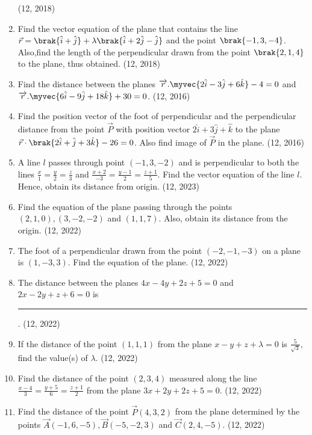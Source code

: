 \begin{enumerate}[label=\thesubsection.\arabic*, ref=\thesubsection.\theenumi]
\hfill (12, 2018)
\item Find the vector equation of the plane that contains the line $\vec{r}=\brak{\hat{i}+\hat{j}}+\lambda \brak{\hat{i}+2\hat{j} - \hat{j}}$ and the point $\brak{-1,3,-4}$. Also,find the length of the perpendicular drawn from the point $\brak{2,1,4}$ to the plane, thus obtained.
\hfill (12, 2018) 
\item Find the distance between the planes
      $    \overrightarrow{r}.\myvec{2\hat{i}-3\hat{j}+6\hat{k} } - 4 =0$
      and
        $  \overrightarrow{r}.\myvec{6\hat{i}-9\hat{j} +18\hat{k}} +30 =0$.
      \hfill (12, 2016)
\item Find the position vector of the foot of perpendicular and the perpendicular distance from the point $\vec{P}$ with position vector $2\hat{i}+3\hat{j}+\hat{k}$ to the plane
 $         \vec{r}\cdot\brak{2\hat{i}+\hat{j}+3\hat{k}} - 26=0$.
      Also find image of $\vec{P}$ in the plane. \hfill (12, 2016)
\item A line $l$ passes through point $(-1,3,-2)$ and is perpendicular to both the lines $\frac {x}{1}=\frac{y}{2}=\frac{z}{3}$ and $\frac {x+2}{-3}=\frac{y-1}{2}=\frac{z+1}{5}$. Find the vector equation of the line $l$. Hence, obtain its distance from origin. \hfill (12, 2023)
\item Find the equation of the plane passing through the points $(2,1,0),(3,-2,-2)$ and $(1,1,7)$. Also, obtain its distance from the origin. \hfill (12, 2022)

\item The foot of a perpendicular drawn from the point $(-2,-1,-3)$ on a plane is $(1,-3,3)$. Find the equation of the plane. \hfill (12, 2022)
\item The distance between the planes $4x-4y+2z+5=0$ and $2x-2y+z+6=0$ is
\rule{1cm}{0.1pt}.
\hfill (12, 2022)
\item If the distance of the point $(1,1,1)$ from the plane $x-y+z+\lambda=0$ is $\frac{5}{\sqrt{3}}$, find the value(s) of $\lambda$. \hfill (12, 2022)

\item Find the distance of the point $(2,3,4)$ measured along the line $\frac{x-4}{3}=\frac{y+5}{6}=\frac{z+1}{2}$ from the plane $3x+2y+2z+5=0$. \hfill (12, 2022)

\item Find the distance of the point $\vec{P}(4,3,2)$ from the plane determined by the points $\vec{A}(-1,6,-5),\vec{B}(-5,-2,3)$ and $\vec{C}(2,4,-5)$. \hfill (12, 2022)


\end{enumerate}
